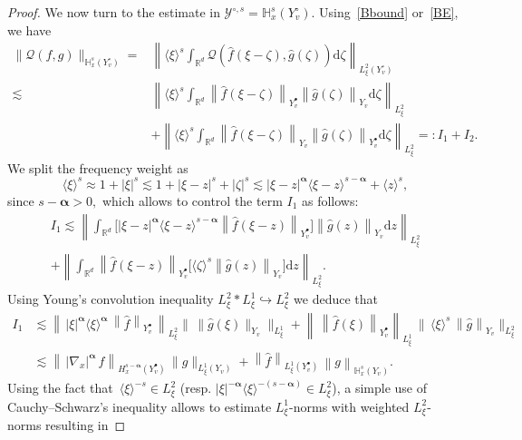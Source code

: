 \documentclass[AHL,Unicode,longabstracts,published]{cedram}
\renewcommand{\d}{\mathrm{d}}
\newcommand{\R}{\mathbb{R}}
\newcommand{\bbH}{\mathbb{H}}
\newcommand{\QQ}{\mathcal{Q}}
\newcommand{\VV}{\mathcal{Y}}
\newcommand{\Sg}{Y}
\newcommand{\Sgp}{Y^{\bullet}}
\newcommand{\Sgm}{Y^{\circ}}
\newcommand{\rSSgm}[1]{\VV^{\circ, #1}}
\newcommand{\la}{\langle}
\newcommand{\ra}{\rangle}
\begin{document}
\begin{proof}
We now turn to the estimate in $\rSSgm{s} = \bbH^s_x (\Sgm_v)$. Using~\eqref{Bbound} or~\eqref{BE}, we have
\begin{align*}
\| \QQ(f, g) \|_{ \bbH^s_x \left(\Sgm_v \right) } = & \left\| \la \xi \ra^s \int_{\R^{d}} \QQ\left(\widehat{f}(\xi - \zeta), \widehat{g}(\zeta) \right) \d \zeta \right\|_{ L^2_\xi \left(\Sgm_v \right) } \\
\lesssim & \left\| \la \xi \ra^s \int_{\R^{d}} \left\| \widehat{f}(\xi - \zeta) \right\|_{ \Sgp_v } \left\| \widehat{g}(\zeta)  \right\|_{ \Sg_v } \d \zeta \right\|_{ L^2_\xi } \\
& + \left\| \la \xi \ra^s \int_{\R^{d}} \left\| \widehat{f}(\xi - \zeta) \right\|_{ \Sg_v } \left\| \widehat{g}(\zeta) \right\|_{ \Sgp_v } \d \zeta \right\|_{ L^2_\xi } =: I_1 + I_2.
\end{align*}
We split the frequency weight as
\[
\la \xi \ra^s \approx 1 + | \xi |^s \lesssim 1 + | \xi - z |^s + | \zeta |^s \lesssim | \xi - z|^{\boldsymbol{\alpha}} \la \xi - z \ra^{s - \boldsymbol{\alpha}} + \la z\ra^s,
\]
since $s-\boldsymbol{\alpha} >0,$ which allows to control the term $I_1$ as follows:
\begin{multline*}
I_1 \lesssim \left\| \int_{\R^{d}} \Big[| \xi - z |^{\boldsymbol{\alpha}} \la \xi - z \ra^{s - \boldsymbol{\alpha}} \left\| \widehat{f}(\xi -z)\right\|_{ \Sgp_v } \Big] \left\| \widehat{g}(z) \right\|_{ \Sg_v } \d z \right\|_{ L^2_\xi } \\
+ \left\| \int_{\R^{d}} \left\| \widehat{f}(\xi -z) \right\|_{ \Sgp_v } \Big[\la \zeta \ra^s \left\| \widehat{g}(z) \right\|_{ \Sg_v }\Big] \d z \right\|_{ L^2_\xi }.
\end{multline*}
Using Young's convolution inequality $L^2_\xi \ast L^1_\xi \hookrightarrow L^2_\xi$ we deduce that
\begin{align*}
I_1 &\lesssim \left\|\,|\xi|^{\boldsymbol{\alpha}}\langle\xi\rangle^{\boldsymbol{\alpha}}\,
\left\|\widehat{f}\right\|_{\Sgp_v}\,\right\|_{L^2_\xi}
\big\|\,\|\widehat{g}(\xi)\|_{\Sg_v}\big\|_{L^1_\xi}+
\left\|\,\left\|\widehat{f}(\xi)\right\|_{\Sgp_v}\right\|_{L^1_\xi}\,\big\|\,\langle\xi\rangle^{s}\,\left\|\widehat{g}\right\|_{\Sg_v}\big\|_{L^2_\xi}\\
&\lesssim \left\|\,|\nabla_x|^{\boldsymbol{\alpha}}\,f\right\|_{H^{s-\boldsymbol{\alpha}}_x(\Sgp_v)}\,\|\widehat{g}\|_{L^1_\xi(\Sg_v)}+\left\|\widehat{f}\right\|_{L^1_\xi(\Sgp_v)}\,\left\|g\right\|_{\bbH^s_x(\Sg_v)}.
\end{align*}
Using the fact that~$\la \xi \ra^{ -s } \in L^2_\xi$ (resp. $| \xi |^{ -\boldsymbol{\alpha} } \la \xi \ra^{-(s - \boldsymbol{\alpha}) } \in L^2_\xi$), a simple use of Cauchy--Schwarz's inequality allows to estimate $L^1_\xi$-norms with weighted $L^2_\xi$-norms resulting in

\end{proof}
\end{document}
